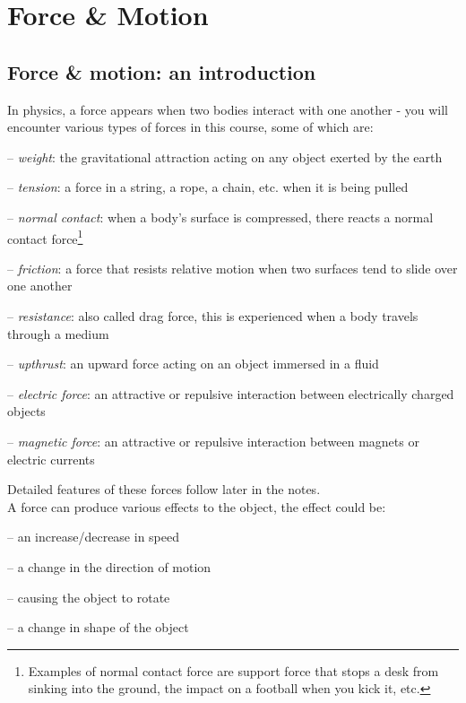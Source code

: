 \chapter{Force \& Motion}

\section{Force \& motion: an introduction}

In physics, a force appears when two bodies interact with one another - you will encounter various types of forces in this course, some of which are:
\begin{compactitem}
	\item[--] \emph{weight}: the gravitational attraction acting on any object exerted by the earth
	
	\item[--] \emph{tension}: a force in a string, a rope, a chain, etc. when it is being pulled
	
	\item[--] \emph{normal contact}: when a body's surface is compressed, there reacts a normal contact force\footnote{Examples of normal contact force are support force that stops a desk from sinking into the ground, the impact on a football when you kick it, etc.}
	
	\item[--] \emph{friction}: a force that resists relative motion when two surfaces tend to slide over one another
	
	\item[--] \emph{resistance}: also called drag force, this is experienced when a body travels through a medium

	
	\item[--] \emph{upthrust}: an upward force acting on an object immersed in a fluid
	
	\item[--] \emph{electric force}: an attractive or repulsive interaction between electrically charged objects
	\item[--] \emph{magnetic force}: an attractive or repulsive interaction between magnets or electric currents
\end{compactitem}

Detailed features of these forces follow later in the notes.\\

A force can produce various effects to the object, the effect could be:

\begin{compactitem}
	\item[--] an increase/decrease in speed
	
	\item[--] a change in the direction of motion
	
	\item[--] causing the object to rotate
	
	\item[--] a change in shape of the object
\end{compactitem}

